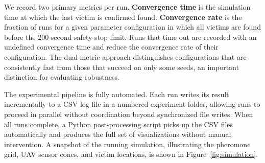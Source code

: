 We record two primary metrics per run. \textbf{Convergence time} is the simulation time at which the last victim is confirmed found. \textbf{Convergence rate} is the fraction of runs for a given parameter configuration in which all victims are found before the 200-second safety-stop limit. Runs that time out are recorded with an undefined convergence time and reduce the convergence rate of their configuration. The dual-metric approach distinguishes configurations that are consistently fast from those that succeed on only some seeds, an important distinction for evaluating robustness.

The experimental pipeline is fully automated. Each run writes its result incrementally to a CSV log file in a numbered experiment folder, allowing runs to proceed in parallel without coordination beyond synchronized file writes. When all runs complete, a Python post-processing script picks up the CSV files automatically and produces the full set of visualizations without manual intervention. A snapshot of the running simulation, illustrating the pheromone grid, UAV sensor cones, and victim locations, is shown in Figure~\ref{fig:simulation}.

